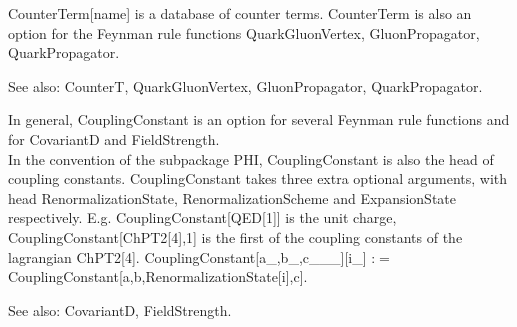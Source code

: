 

CounterTerm[name] is a database of counter terms. CounterTerm is also an option for the Feynman rule functions QuarkGluonVertex,
  GluonPropagator, QuarkPropagator.

See also:  CounterT, QuarkGluonVertex, GluonPropagator, QuarkPropagator.






In general, CouplingConstant is an option for several Feynman rule functions and for CovariantD and FieldStrength.\\
In the convention of the subpackage PHI, CouplingConstant is also the head of coupling constants. { }CouplingConstant takes three extra
  optional arguments, with head RenormalizationState, RenormalizationScheme and ExpansionState respectively. { }E.g.
  CouplingConstant[QED[1]] is the unit charge, CouplingConstant[ChPT2[4],1] is the first of the coupling constants of the lagrangian
  ChPT2[4]. { }CouplingConstant[a\_{},b\_{},c\_{}\_{}\_{}][i\_{}] :\(=\) CouplingConstant[a,b,RenormalizationState[i],c].

See also:  CovariantD, FieldStrength.



